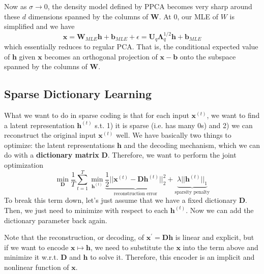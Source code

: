   Now as $\sigma \rightarrow 0$, the density model defined by PPCA becomes very sharp around these $d$ dimensions spanned by the columns of $\mathbf{W}$. At $0$, our MLE of $W$ is simplified and we have 
  \begin{equation}
    \mathbf{x} = \mathbf{W}_{MLE} \mathbf{h} + \mathbf{b}_{MLE} + \epsilon = \mathbf{U}_q \boldsymbol{\Lambda}_q^{1/2} \mathbf{h} + \mathbf{b}_{MLE}
  \end{equation}
  which essentially reduces to regular PCA. That is, the conditional expected value of $\mathbf{h}$ given $\mathbf{x}$ becomes an orthogonal projection of $\mathbf{x} - \mathbf{b}$ onto the subspace spanned by the columns of $\mathbf{W}$.  

\subsection{Sparse Dictionary Learning}

  What we want to do in sparse coding is that for each input $\mathbf{x}^{(t)}$, we want to find a latent representation $\mathbf{h}^{(t)}$ s.t. 1) it is sparse (i.e. has many $0$s) and 2) we can reconstruct the original input $\mathbf{x}^{(t)}$ well. We have basically two things to optimize: the latent representations $\mathbf{h}$ and the decoding mechanism, which we can do with a \textbf{dictionary matrix} $\mathbf{D}$. Therefore, we want to perform the joint optimization
  \begin{equation}
    \min_{\mathbf{D}} \frac{1}{T} \sum_{t=1}^T \min_{\mathbf{h}^{(t)}} \underbrace{\frac{1}{2} ||\mathbf{x}^{(t)} - \mathbf{D} \mathbf{h}^{(t)}||_2^2}_{\text{reconstruction error}} + \underbrace{\lambda ||\mathbf{h}^{(t)}||_1}_{\text{sparsity penalty}}
  \end{equation}
  To break this term down, let's just assume that we have a fixed dictionary $\mathbf{D}$. Then, we just need to minimize with respect to each $\mathbf{h}^{(t)}$. Now we can add the dictionary parameter back again. 

  Note that the reconstruction, or decoding, of $\mathbf{x}^\prime = \mathbf{D} \mathbf{h}$ is linear and explicit, but if we want to encode $\mathbf{x} \mapsto \mathbf{h}$, we need to substitute the $\mathbf{x}$ into the term above and minimize it w.r.t. $\mathbf{D}$ and $\mathbf{h}$ to solve it. Therefore, this encoder is an implicit and nonlinear function of $\mathbf{x}$. 

